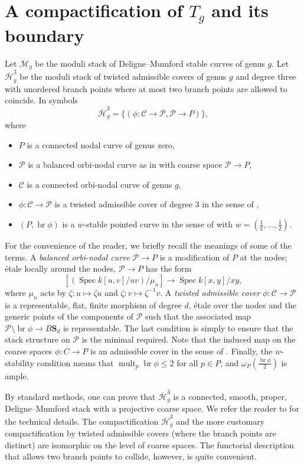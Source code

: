 \documentclass{amsart}
\newcommand {\from}{{\colon}}
\newcommand{\orb}[1]{{\mathcal #1}}     %
\renewcommand {\o}[1]{\overline{#1}}
\DeclareMathOperator{\spec}{Spec}
\DeclareMathOperator{\br}{br}
\newcommand{\s}{\mathbf S}
\renewcommand{\o}{\overline}
\DeclareMathOperator{\mult}{mult}
\begin{document}
\section{A compactification of $T_g$ and its boundary}\label{sec:compactification}
Let $\o{\orb M}_g$ be the moduli stack of Deligne--Mumford stable curves of genus $g$.  Let $\o {\orb H}^3_g$ be the moduli stack of twisted admissible covers of genus $g$ and degree three with unordered branch points where at most two branch points are allowed to coincide. In symbols
\[ \o{\orb H}^3_g = \{(\phi \from \orb C \to \orb P, \orb P \to P)\},\]
where
\begin{itemize}[\qquad]
\item $P$ is a connected nodal curve of genus zero,
\item $\orb P$ is a balanced orbi-nodal curve as in \citep{acv:03} with coarse space $\orb P \to P$,
\item $\orb C$ is a connected orbi-nodal curve of genus $g$,
\item $\phi \from \orb C \to \orb P$ is a twisted admissible cover of degree $3$ in the sense of \citep{acv:03}, 
\item $(P, \br\phi)$ is a $w$-stable pointed curve in the sense of \citep{hassett03:_modul} with $w = (\frac12, \dots, \frac12)$. 
\end{itemize}
For the convenience of the reader, we briefly recall the meanings of some of the terms. A \emph{balanced orbi-nodal curve} $\orb P \to P$ is a  modification of $P$ at the nodes; \'etale locally around the nodes, $\orb P \to P$ has the form
\[ [(\spec k[u,v]/uv)/\mu_n] \to \spec k[x,y]/xy,\]
where $\mu_n$ acts by $\zeta \from u \mapsto \zeta u$ and $\zeta \from v \mapsto \zeta^{-1}v$. A \emph{twisted admissible cover} $\phi \from \orb C \to \orb P$ is a representable, flat, finite morphism of degree $d$, \'etale over the nodes and the generic points of the components of $\orb P$ such that the associated map $\orb P \setminus \br\phi \to B\s_d$ is representable. The last condition is simply to ensure that the stack structure on $\orb P$ is the minimal required. Note that the induced map on the coarse spaces $\phi \from C \to P$ is an admissible cover in the sense of \citet{harris82:_kodair_dimen_of_modul_space_of_curves}. Finally, the  $w$-stability condition means that $\mult_p \br\phi \leq 2$ for all $p \in P$, and $\omega_P\left( \frac{\br\phi}{2}\right)$ is ample. 

By standard methods, one can prove that $\o {\orb H}^3_g$ is a connected, smooth, proper, Deligne--Mumford stack with a projective coarse space. We refer the reader to \citep{deopurkar12:_compac_hurwit} for the technical details. The compactification $\o {\orb H}^3_g$ and the more customary compactification by twisted admissible covers (where the branch points are distinct) are isomorphic on the level of coarse spaces. The functorial description that allows two branch points to collide, however, is quite convenient.
\end{document}
